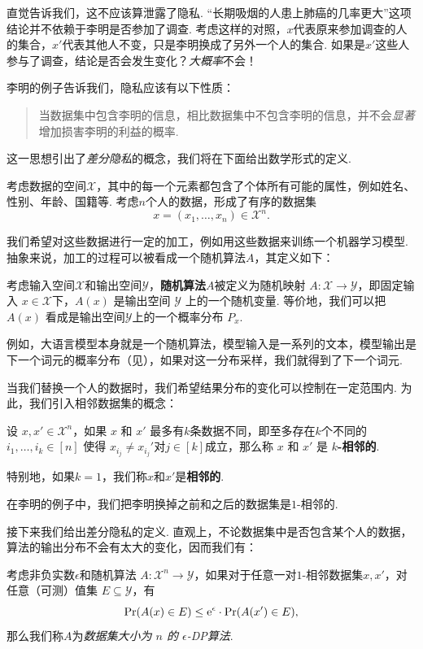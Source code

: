 直觉告诉我们，这不应该算泄露了隐私. “长期吸烟的人患上肺癌的几率更大”这项结论并不依赖于李明是否参加了调查. 考虑这样的对照，$x$代表原来参加调查的人的集合，$x'$代表其他人不变，只是李明换成了另外一个人的集合. 如果是$x'$这些人参与了调查，结论是否会发生变化？\textit{大概率}不会！

李明的例子告诉我们，隐私应该有以下性质：
\begin{quotation}
    当数据集中包含李明的信息，相比数据集中不包含李明的信息，并不会\textit{显著}增加损害李明的利益的概率.
\end{quotation}
这一思想引出了\textit{差分隐私}的概念，我们将在下面给出数学形式的定义.

考虑数据的空间$\mathcal X$，其中的每一个元素都包含了个体所有可能的属性，例如姓名、性别、年龄、国籍等. 考虑$n$个人的数据，形成了有序的数据集
\[x = (x_1, \dots, x_n) \in \mathcal X^n.\]  

我们希望对这些数据进行一定的加工，例如用这些数据来训练一个机器学习模型. 抽象来说，加工的过程可以被看成一个随机算法$A$，其定义如下：
\begin{definition}[随机算法]
    考虑输入空间$\mathcal X$和输出空间$\mathcal Y$，\textbf{随机算法}$A$被定义为随机映射 $A : \mathcal X \to \mathcal Y$，即固定输入 $x \in \mathcal X$下，$A(x)$ 是输出空间 $\mathcal Y$ 上的一个随机变量. 等价地，我们可以把 $A(x)$ 看成是输出空间$\mathcal Y$上的一个概率分布 $P_x$. 
\end{definition}

例如，大语言模型本身就是一个随机算法，模型输入是一系列的文本，模型输出是下一个词元的概率分布（见），如果对这一分布采样，我们就得到了下一个词元.

当我们替换一个人的数据时，我们希望结果分布的变化可以控制在一定范围内. 为此，我们引入相邻数据集的概念：

\begin{definition}[$k$-相邻数据集]
    设 $x, x' \in \mathcal X^n$，如果 $x$ 和 $x'$ 最多有$k$条数据不同，即至多存在$k$个不同的$i_1,\dots,i_k \in [n]$ 使得 $x_{i_j}\neq x_{i_j}'$对$j\in[k]$成立，那么称 $x$ 和 $x'$ 是 \textbf{$k$-相邻的}. 
    
    特别地，如果$k=1$，我们称$x$和$x'$是\textbf{相邻的}.
\end{definition}

在李明的例子中，我们把李明换掉之前和之后的数据集是$1$-相邻的. 

接下来我们给出差分隐私的定义. 直观上，不论数据集中是否包含某个人的数据，算法的输出分布不会有太大的变化，因而我们有：

\begin{definition}
考虑非负实数$\epsilon$和随机算法 $A : \mathcal X^n \to \mathcal Y$，如果对于任意一对$1$-相邻数据集$x, x'$，对任意（可测）值集 $E \subseteq \mathcal Y$，有
\[
\Pr(A(x)\in E) \leq \mathrm{e}^{\epsilon} \cdot \Pr(A(x')\in E),
\]
那么我们称$A$为\textit{数据集大小为 $n$ 的 $\epsilon$-DP算法}.
\end{definition}

